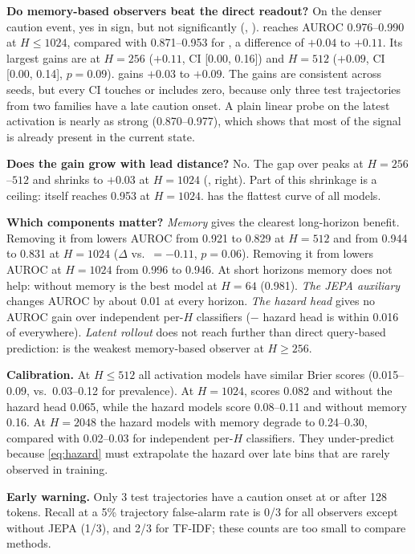 

{\bf Do memory-based observers beat the direct readout?}
On the denser caution event, yes in sign, but not significantly (, ).
\hier reaches AUROC 0.976--0.990 at $H \le 1024$, compared with 0.871--0.953 for \directao, a difference of $+0.04$ to $+0.11$.
Its largest gains are at $H=256$ ($+0.11$, CI [0.00, 0.16]) and $H=512$ ($+0.09$, CI [0.00, 0.14], $p=0.09$).
\hq gains $+0.03$ to $+0.09$.
The gains are consistent across seeds, but every CI touches or includes zero, because only three test trajectories from two families have a late caution onset.
A plain linear probe on the latest activation is nearly as strong (0.870--0.977), which shows that most of the signal is already present in the current state.

{\bf Does the gain grow with lead distance?}
No.
The gap over \directao peaks at $H = 256$--$512$ and shrinks to $+0.03$ at $H=1024$ (, right).
Part of this shrinkage is a ceiling: \directao itself reaches 0.953 at $H=1024$.
\hier has the flattest curve of all models.

{\bf Which components matter?}
\emph{Memory} gives the clearest long-horizon benefit.
Removing it from \roll lowers AUROC from 0.921 to 0.829 at $H=512$ and from 0.944 to 0.831 at $H=1024$ ($\Delta$ vs.\ \directao $=-0.11$, $p=0.06$).
Removing it from \hq lowers AUROC at $H=1024$ from 0.996 to 0.946.
At short horizons memory does not help: \hq without memory is the best model at $H=64$ (0.981).
\emph{The JEPA auxiliary} changes AUROC by about 0.01 at every horizon.
\emph{The hazard head} gives no AUROC gain over independent per-$H$ classifiers (\hq $-$ hazard head is within 0.016 of \hq everywhere).
\emph{Latent rollout} does not reach further than direct query-based prediction: \roll is the weakest memory-based observer at $H \ge 256$.

{\bf Calibration.}
At $H \le 512$ all activation models have similar Brier scores (0.015--0.09, vs.\ 0.03--0.12 for prevalence).
At $H = 1024$, \directao scores 0.082 and \hq without the hazard head 0.065, while the hazard models score 0.08--0.11 and \roll without memory 0.16.
At $H=2048$ the hazard models with memory degrade to 0.24--0.30, compared with 0.02--0.03 for independent per-$H$ classifiers.
They under-predict because \eqref{eq:hazard} must extrapolate the hazard over late bins that are rarely observed in training.

{\bf Early warning.}
Only 3 test trajectories have a caution onset at or after 128 tokens.
Recall at a 5\% trajectory false-alarm rate is 0/3 for all observers except \hq without JEPA (1/3), and 2/3 for TF-IDF; these counts are too small to compare methods.

